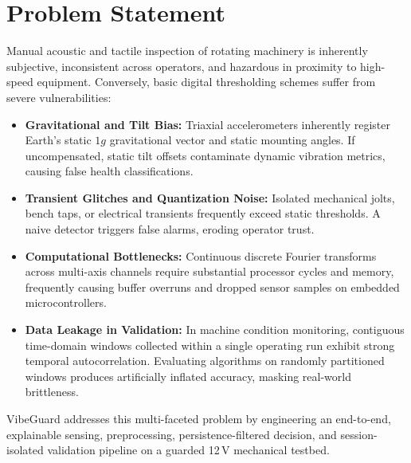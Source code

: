 \section{Problem Statement}
Manual acoustic and tactile inspection of rotating machinery is inherently subjective, inconsistent across operators, and hazardous in proximity to high-speed equipment. Conversely, basic digital thresholding schemes suffer from severe vulnerabilities:
\begin{itemize}
    \item \textbf{Gravitational and Tilt Bias:} Triaxial accelerometers inherently register Earth's static $1g$ gravitational vector and static mounting angles. If uncompensated, static tilt offsets contaminate dynamic vibration metrics, causing false health classifications.
    \item \textbf{Transient Glitches and Quantization Noise:} Isolated mechanical jolts, bench taps, or electrical transients frequently exceed static thresholds. A naive detector triggers false alarms, eroding operator trust.
    \item \textbf{Computational Bottlenecks:} Continuous discrete Fourier transforms across multi-axis channels require substantial processor cycles and memory, frequently causing buffer overruns and dropped sensor samples on embedded microcontrollers.
    \item \textbf{Data Leakage in Validation:} In machine condition monitoring, contiguous time-domain windows collected within a single operating run exhibit strong temporal autocorrelation. Evaluating algorithms on randomly partitioned windows produces artificially inflated accuracy, masking real-world brittleness.
\end{itemize}

VibeGuard addresses this multi-faceted problem by engineering an end-to-end, explainable sensing, preprocessing, persistence-filtered decision, and session-isolated validation pipeline on a guarded 12\,V mechanical testbed.

